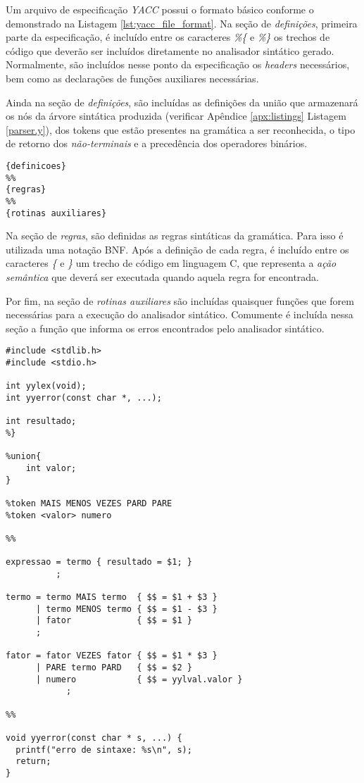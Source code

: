 Um arquivo de especificação \emph{YACC} possui o formato básico conforme
o demonstrado na Listagem \ref{lst:yacc_file_format}. Na seção de
\emph{definições}, primeira parte da especificação, é incluído entre os
caracteres \emph{\%\{} e \emph{\%\}} os trechos de código que deverão ser
incluídos diretamente no analisador sintático gerado. Normalmente, são
incluídos nesse ponto da especificação os \emph{headers} necessários, bem
como as declarações de funções auxiliares necessárias.

Ainda na seção de \emph{definições}, são incluídas as definições da união que
armazenará os nós da árvore sintática produzida (verificar Apêndice
\ref{apx:listings} Listagem \ref{parser.y}), dos tokens que estão presentes na
gramática a ser reconhecida, o tipo de retorno dos \emph{não-terminais} e a
precedência dos operadores binários.

\begin{lstlisting}[label=lst:yacc_file_format, caption=Formato Especificação YACC]
{definicoes}
%%
{regras}
%%
{rotinas auxiliares}
\end{lstlisting}

Na seção de \emph{regras}, são definidas as regras sintáticas da gramática.
Para isso é utilizada uma notação BNF. Após a definição de cada regra, é
incluído entre os caracteres \emph{\{} e \emph{\}} um trecho de código em
linguagem C, que representa a \emph{ação semântica} que deverá ser executada
quando aquela regra for encontrada.

Por fim, na seção de \emph{rotinas auxiliares} são incluídas quaisquer funções
que forem necessárias para a execução do analisador sintático. Comumente é
incluída nessa seção a função que informa os erros encontrados pelo analisador
sintático.

\begin{lstlisting}[label=lst:yacc_example, caption=Exemplo de especificação
YACC]
%{
#include <stdlib.h>
#include <stdio.h>

int yylex(void);
int yyerror(const char *, ...);

int resultado;
%}

%union{
	int valor;
}

%token MAIS MENOS VEZES PARD PARE
%token <valor> numero

%%

expressao = termo { resultado = $1; }
          ;

termo = termo MAIS termo  { $$ = $1 + $3 }
      | termo MENOS termo { $$ = $1 - $3 }
      | fator             { $$ = $1 }
      ;

fator = fator VEZES fator { $$ = $1 * $3 }
      | PARE termo PARD   { $$ = $2 }
      | numero            { $$ = yylval.valor }
			;

%%

void yyerror(const char * s, ...) {
  printf("erro de sintaxe: %s\n", s);
  return;
}
\end{lstlisting}

